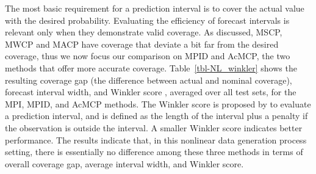 \documentclass[
  11pt,
  a4paper,
]{article}
\theoremstyle{plain}
\theoremstyle{plain}
\theoremstyle{remark}
\begin{document}
The most basic requirement for a prediction interval is to cover the
actual value with the desired probability. Evaluating the efficiency of
forecast intervals is relevant only when they demonstrate valid
coverage. As discussed, MSCP, MWCP and MACP have coverage that deviate a
bit far from the desired coverage, thus we now focus our comparison on
MPID and AcMCP, the two methods that offer more accurate coverage.
Table~\ref{tbl-NL_winkler} shows the resulting coverage gap (the
difference between actual and nominal coverage), forecast interval
width, and Winkler score \autocite{winkler1972}, averaged over all test
sets, for the MPI, MPID, and AcMCP methods. The Winkler score is
proposed by \textcite{winkler1972} to evaluate a prediction interval,
and is defined as the length of the interval plus a penalty if the
observation is outside the interval. A smaller Winkler score indicates
better performance. The results indicate that, in this nonlinear data
generation process setting, there is essentially no difference among
these three methods in terms of overall coverage gap, average interval
width, and Winkler score.

\begin{table}

\caption{\label{tbl-NL_winkler}Nonlinear simulation results showing
coverage gap, interval width, and Winkler score, averaged over all test
sets.}


\end{table}%
\end{document}
